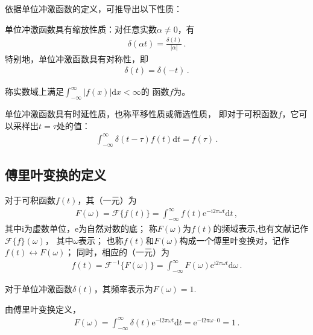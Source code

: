 依据单位冲激函数的定义，可推导出以下性质：
\begin{theorem}
    单位冲激函数具有缩放性质：对任意实数$\alpha\neq0$，有
    \begin{align}
        \delta(\alpha t)=\frac{\delta(t)}{|\alpha|}\, .
    \end{align}
    特别地，单位冲激函数具有对称性，即
    \begin{align}
        \delta(t)=\delta(-t)\, .
    \end{align}
\end{theorem}
\begin{definition}
    称实数域上满足$\displaystyle\int_{-\infty}^{\infty}|f(x)|\mathrm{d}x<\infty$的
    函数$f$为。
\end{definition}
\begin{theorem}\label{theorem:7.ex01.1}
    单位冲激函数具有时延性质，也称平移性质或筛选性质，
    即对于可积函数$f$，它可以采样出$t=\tau$处的值：
    \begin{align}
        \int_{-\infty}^{\infty}\delta(t-\tau)f(t)\mathrm{d}t=f(\tau)\, .
    \end{align}
\end{theorem}
\subsection{傅里叶变换的定义}\label{sub:傅里叶变换的定义}
\begin{definition}
    对于可积函数$f(t)$，其（一元）为
    \begin{align}
        F(\omega)=\mathcal{F}\{f(t)\}=\int_{-\infty}^{\infty}f(t)\mathrm{e}^{-\mathrm{i}2\pi\omega t}\mathrm{d}t\, ,
    \end{align}
    其中$\mathrm{i}$为虚数单位，$\mathrm{e}$为自然对数的底；
    称$F(\omega)$为$f(t)$的频域表示,也有文献记作$\mathcal{F}\{f\}(\omega)$，
    其中$\omega$表示；
    也称$f(t)$和$F(\omega)$构成一个傅里叶变换对，记作$f(t)\leftrightarrow F(\omega)$；
    同时，相应的（一元）为
    \begin{align}\label{eq:7.ex01.inverseFourier}
        f(t)=\mathcal{F}^{-1}\{F(\omega)\}=\int_{-\infty}^{\infty}F(\omega)\mathrm{e}^{\mathrm{i}2\pi\omega t}\mathrm{d}\omega\, .
    \end{align}
\end{definition}

\begin{theorem}\label{theorem:7.ex01.2}
    对于单位冲激函数$\delta(t)$，其频率表示为$F(\omega)=1$.
\end{theorem}
\begin{prove}
    由傅里叶变换定义，
    \begin{align}
        F(\omega)=\int_{-\infty}^{\infty}\delta(t)\mathrm{e}^{-\mathrm{i}2\pi\omega t}\mathrm{d}t
        =\mathrm{e}^{-\mathrm{i}2\pi\omega\cdot0}
        =1\, .
    \end{align}
\end{prove}

